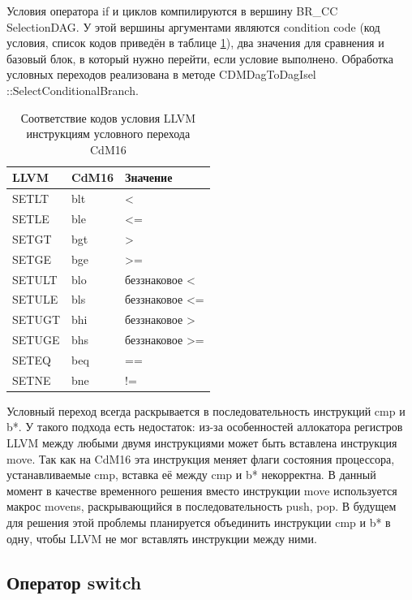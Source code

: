 \documentclass[a4paper,14pt]{extarticle}
\begin{document}
Условия оператора if и циклов компилируются в вершину BR\_CC\\SelectionDAG. У этой вершины аргументами являются condition code (код условия, список кодов приведён в таблице \ref{another-fucking-table}), два значения для сравнения и базовый блок, в который нужно перейти, если условие выполнено. Обработка условных переходов реализована в методе CDMDagToDagIsel\\::SelectConditionalBranch.
\begin{table}[!h]
	\caption{Соответствие кодов условия LLVM инструкциям условного перехода CdM16}
	\label{another-fucking-table}
	\begin{center}
		\begin{tabular}{ |l|l|l|  }
			\hline
			LLVM & CdM16 & Значение \\
			\hline
			SETLT & blt & < \\
			SETLE & ble & <= \\
			SETGT & bgt & > \\
			SETGE & bge & >= \\
			SETULT & blo & беззнаковое < \\
			SETULE & bls & беззнаковое <= \\
			SETUGT & bhi & беззнаковое > \\
			SETUGE & bhs & беззнаковое >= \\
			SETEQ & beq & ==\\
			SETNE & bne & != \\

			\hline
		\end{tabular}
	\end{center}
\end{table}
Условный переход всегда раскрывается в последовательность инструкций cmp и b*. У такого подхода есть недостаток: из-за особенностей аллокатора регистров LLVM между любыми двумя инструкциями может быть вставлена инструкция move. Так как на CdM16 эта инструкция меняет флаги состояния процессора, устанавливаемые cmp, вставка её между cmp и b* некорректна. В данный момент в качестве временного решения вместо инструкции move используется макрос movens, раскрывающийся в последовательность push, pop. В будущем для решения этой проблемы планируется объединить инструкции cmp и b* в одну, чтобы LLVM не мог вставлять инструкции между ними.

\subsection{Оператор switch}
\end{document}
